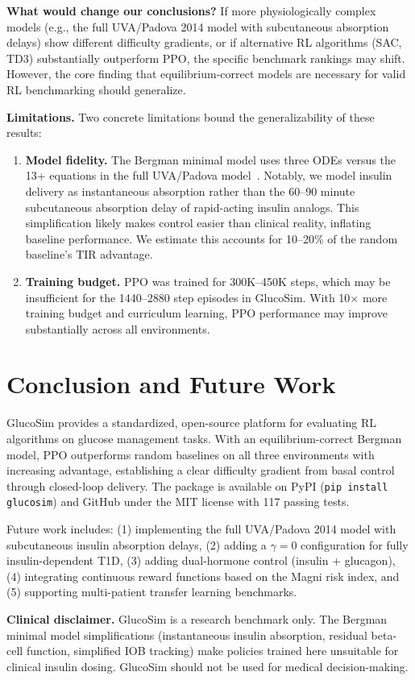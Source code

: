 \documentclass[11pt]{article}
\begin{document}
\textbf{What would change our conclusions?}
If more physiologically complex models (e.g., the full UVA/Padova 2014 model with subcutaneous absorption delays) show different difficulty gradients, or if alternative RL algorithms (SAC, TD3) substantially outperform PPO, the specific benchmark rankings may shift. However, the core finding that equilibrium-correct models are necessary for valid RL benchmarking should generalize.

\textbf{Limitations.}
Two concrete limitations bound the generalizability of these results:

\begin{enumerate}
    \item \textbf{Model fidelity.} The Bergman minimal model uses three ODEs versus the 13+ equations in the full UVA/Padova model~\citep{dallaman2014uvapadova}. Notably, we model insulin delivery as instantaneous absorption rather than the 60--90 minute subcutaneous absorption delay of rapid-acting insulin analogs. This simplification likely makes control easier than clinical reality, inflating baseline performance. We estimate this accounts for 10--20\% of the random baseline's TIR advantage.

    \item \textbf{Training budget.} PPO was trained for 300K--450K steps, which may be insufficient for the 1440--2880 step episodes in GlucoSim. With 10$\times$ more training budget and curriculum learning, PPO performance may improve substantially across all environments.
\end{enumerate}

\section{Conclusion and Future Work}

GlucoSim provides a standardized, open-source platform for evaluating RL algorithms on glucose management tasks. With an equilibrium-correct Bergman model, PPO outperforms random baselines on all three environments with increasing advantage, establishing a clear difficulty gradient from basal control through closed-loop delivery. The package is available on PyPI (\texttt{pip install glucosim}) and GitHub under the MIT license with 117 passing tests.

Future work includes: (1) implementing the full UVA/Padova 2014 model with subcutaneous insulin absorption delays, (2) adding a $\gamma = 0$ configuration for fully insulin-dependent T1D, (3) adding dual-hormone control (insulin + glucagon), (4) integrating continuous reward functions based on the Magni risk index, and (5) supporting multi-patient transfer learning benchmarks.

\textbf{Clinical disclaimer.} GlucoSim is a research benchmark only. The Bergman minimal model simplifications (instantaneous insulin absorption, residual beta-cell function, simplified IOB tracking) make policies trained here unsuitable for clinical insulin dosing. GlucoSim should not be used for medical decision-making.



\end{document}

